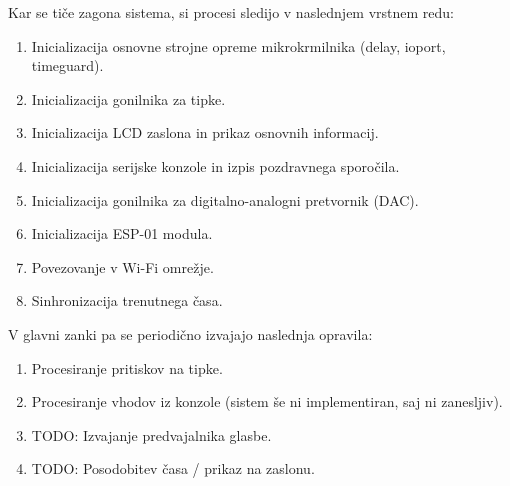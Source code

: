 \documentclass[12pt,a4paper,twoside,openright,slovene]{book}
\begin{document}
Kar se tiče zagona sistema, si procesi sledijo v naslednjem vrstnem redu:

\begin{enumerate}
	\item Inicializacija osnovne strojne opreme mikrokrmilnika (delay, ioport, timeguard).
	\item Inicializacija gonilnika za tipke.
	\item Inicializacija LCD zaslona in prikaz osnovnih informacij.
	\item Inicializacija serijske konzole in izpis pozdravnega sporočila.
	\item Inicializacija gonilnika za digitalno-analogni pretvornik (DAC).
	\item Inicializacija ESP-01 modula.
	\item Povezovanje v Wi-Fi omrežje.
	\item Sinhronizacija trenutnega časa.
\end{enumerate}

V glavni zanki pa se periodično izvajajo naslednja opravila:

\begin{enumerate}
	\item Procesiranje pritiskov na tipke.
	\item Procesiranje vhodov iz konzole (sistem še ni implementiran, saj ni zanesljiv).
	\item TODO: Izvajanje predvajalnika glasbe.
	\item TODO: Posodobitev časa / prikaz na zaslonu.
\end{enumerate}
\end{document}
